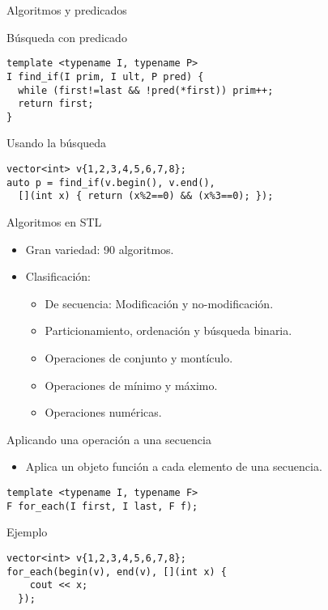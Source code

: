 \begin{frame}[t,fragile]{Algoritmos y predicados}
\begin{block}{Búsqueda con predicado}
\begin{lstlisting}[]
template <typename I, typename P>
I find_if(I prim, I ult, P pred) {
  while (first!=last && !pred(*first)) prim++;
  return first;
}
\end{lstlisting}
\end{block}
\pause
\begin{block}{Usando la búsqueda}
\begin{lstlisting}[]
vector<int> v{1,2,3,4,5,6,7,8};
auto p = find_if(v.begin(), v.end(), 
  [](int x) { return (x%2==0) && (x%3==0); });
\end{lstlisting}
\end{block}
\end{frame}

\begin{frame}[t]{Algoritmos en STL}
\begin{itemize}
  \item Gran variedad: 90 algoritmos.
  \vfill
  \item Clasificación:
    \begin{itemize}
      \item De secuencia: Modificación y no-modificación.
      \item Particionamiento, ordenación y búsqueda binaria.
      \item Operaciones de conjunto y montículo.
      \item Operaciones de mínimo y máximo.
      \item Operaciones numéricas.
    \end{itemize}
\end{itemize}
\end{frame}

\begin{frame}[t,fragile]{Aplicando una operación a una secuencia}
\begin{itemize}
  \item Aplica un objeto función a cada elemento de una secuencia.
\end{itemize}
\begin{lstlisting}[]
template <typename I, typename F>
F for_each(I first, I last, F f);
\end{lstlisting}
\begin{block}{Ejemplo}
\begin{lstlisting}[]
vector<int> v{1,2,3,4,5,6,7,8};
for_each(begin(v), end(v), [](int x) {
    cout << x;
  });
\end{lstlisting}
\end{block}
\end{frame}

